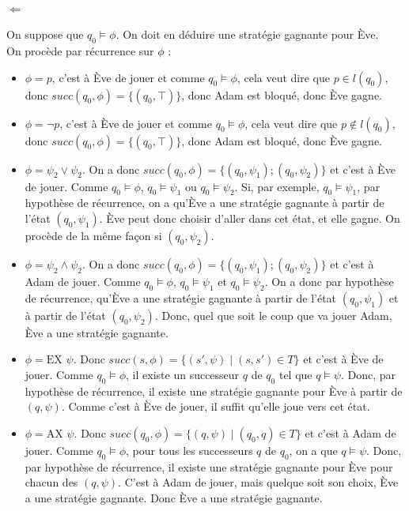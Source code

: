 \documentclass[10pt,a4paper]{article}
\begin{document}
\paragraph{$\Longleftarrow$}
On suppose que $q_0 \vDash \phi$. On doit en déduire une stratégie gagnante pour Ève.\\
On procède par récurrence sur $\phi$ :
\begin{itemize}
\item $\phi = p$, c'est à Ève de jouer et comme $q_0 \vDash \phi$, cela veut dire que $p \in l(q_0)$, donc $succ(q_0,\phi) = \{(q_0, \top)\}$, donc Adam est bloqué, donc Ève gagne.
\item $\phi = \neg p$, c'est à Ève de jouer et comme $q_0 \vDash \phi$, cela veut dire que $p \notin l(q_0)$, donc $succ(q_0,\phi) = \{(q_0, \top)\}$, donc Adam est bloqué, donc Ève gagne.

\item $\phi = \psi_2 \lor \psi_2$. On a donc $succ(q_0,\phi) = \{(q_0, \psi_1); (q_0, \psi_2) \}$ et c'est à Ève de jouer. Comme $q_0 \vDash \phi$, $q_0 \vDash \psi_1$ ou $q_0 \vDash \psi_2$. Si, par exemple, $q_0 \vDash \psi_1$, par hypothèse de récurrence, on a qu'Ève a une stratégie gagnante à partir de l'état $(q_0, \psi_1)$. Ève peut donc choisir d'aller dans cet état, et elle gagne. On procède de la même façon si $(q_0, \psi_2)$.

\item $\phi = \psi_2 \land \psi_2$. On a donc $succ(q_0,\phi) = \{(q_0, \psi_1); (q_0, \psi_2) \}$ et c'est à Adam de jouer. Comme $q_0 \vDash \phi$, $q_0 \vDash \psi_1$ et $q_0 \vDash \psi_2$. On a donc par hypothèse de récurrence, qu'Ève a une stratégie gagnante à partir de l'état $(q_0, \psi_1)$ et à partir de l'état $(q_0, \psi_2)$. Donc, quel que soit le coup que va jouer Adam, Ève a une stratégie gagnante.

\item $\phi = \mbox{EX } \psi$. Donc $succ(s, \phi) = \{ (s', \psi) \mid (s,s') \in T \} $ et c'est à Ève de jouer. Comme $q_0 \vDash \phi$, il existe un successeur $q$ de $q_0$ tel que $q \vDash \psi$. Donc, par hypothèse de récurrence, il existe une stratégie gagnante pour Ève à partir de $(q, \psi)$. Comme c'est à Ève de jouer, il suffit qu'elle joue vers cet état.

\item $\phi = \mbox{AX } \psi$. Donc $succ(q_0, \phi) = \{ (q, \psi) \mid (q_0,q) \in T \} $ et c'est à Adam de jouer. Comme $q_0 \vDash \phi$, pour tous les successeurs $q$ de $q_0$, on a que $q \vDash \psi$. Donc, par hypothèse de récurrence, il existe une stratégie gagnante pour Ève pour chacun des $(q, \psi)$. C'est à Adam de jouer, mais quelque soit son choix, Ève a une stratégie gagnante. Donc Ève a une stratégie gagnante.


\end{itemize}
\end{document}
